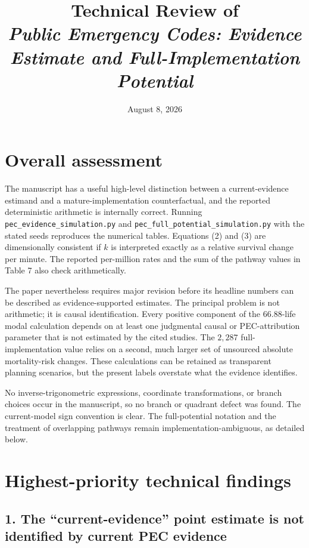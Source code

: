 \documentclass[11pt]{article}
\title{Technical Review of\\
\emph{Public Emergency Codes: Evidence Estimate and Full-Implementation Potential}}
\author{}
\date{August 8, 2026}
\begin{document}
\maketitle

\section*{Overall assessment}

The manuscript has a useful high-level distinction between a current-evidence
estimand and a mature-implementation counterfactual, and the reported
deterministic arithmetic is internally correct.  Running
\texttt{pec\_evidence\_simulation.py} and
\texttt{pec\_full\_potential\_simulation.py} with the stated seeds reproduces
the numerical tables.  Equations (2) and (3) are dimensionally consistent if
$k$ is interpreted exactly as a relative survival change per minute.  The
reported per-million rates and the sum of the pathway values in Table 7 also
check arithmetically.

The paper nevertheless requires major revision before its headline numbers can
be described as evidence-supported estimates.  The principal problem is not
arithmetic; it is causal identification.  Every positive component of the
$66.88$-life modal calculation depends on at least one judgmental causal or
PEC-attribution parameter that is not estimated by the cited studies.  The
$2{,}287$ full-implementation value relies on a second, much larger set of
unsourced absolute mortality-risk changes.  These calculations can be retained
as transparent planning scenarios, but the present labels overstate what the
evidence identifies.

No inverse-trigonometric expressions, coordinate transformations, or branch
choices occur in the manuscript, so no branch or quadrant defect was found.
The current-model sign convention is clear.  The full-potential notation and
the treatment of overlapping pathways remain implementation-ambiguous, as
detailed below.

\section*{Highest-priority technical findings}

\subsection*{1. The ``current-evidence'' point estimate is not identified by current PEC evidence}
\end{document}
